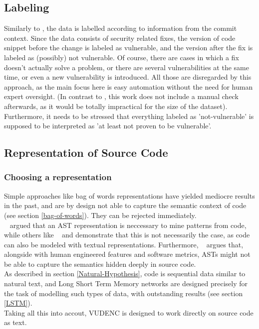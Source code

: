 \documentclass[
	a4paper,
	pagesize,
	pdftex,
	12pt,
	twoside, %
	BCOR=5mm, %
	ngerman,
	fleqn,
	final,
	]{scrartcl}
\begin{document}
\subsection{Labeling}
Similarly to \cite{Li.2018}, the data is labelled according to information from the commit context. Since the data consists of security related fixes, the version of code snippet before the change is labeled as vulnerable, and the version after the fix is labeled as (possibly) not vulnerable. Of course, there are cases in which a fix doesn't actually solve a problem, or there are several vulnerabilities at the same time, or even a new vulnerability is introduced. All those are disregarded by this approach, as the main focus here is easy automation without the need for human expert oversight. (In contrast to \cite{Li.2018}, this work does not include a manual check afterwards, as it would be totally impractical for the size of the dataset). Furthermore, it needs to be stressed that everything labeled as 'not-vulnerable' is supposed to be interpreted as 'at least not proven to be vulnerable'.

\subsection{Representation of Source Code}

\subsubsection{Choosing a representation}
Simple approaches like bag of words representations have yielded mediocre results in the past, and are by design not able to capture the semantic context of code (see section \ref{bag-of-words}). They can be rejected immediately.\\
~\cite{Liu.2018} argued that an AST representation is neccessary to mine patterns from code, while others like ~\cite{Russell.2018} and \cite{Hovsepyan.2012} demonstrate that this is not necessarily the case, as code can also be modeled with textual representations. Furthermore, ~\cite{Dam.2016} argues that, alongside with human engineered features and software metrics, ASTs might not be able to capture the semantics hidden deeply in source code.\\
As described in section \ref{Natural-Hypothesis}, code is sequential data similar to natural text, and Long Short Term Memory networks are designed precisely for the task of modelling such types of data, with outstanding results (see section \ref{LSTM}).\\
Taking all this into accout, VUDENC is designed to work directly on source code as text.
\end{document}
